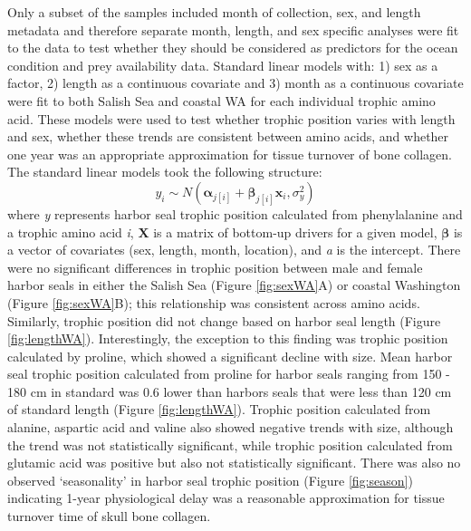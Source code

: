 \documentclass [11pt, proquest] {uwthesis}[2015/03/03]
\begin{document}
Only a subset of the samples included month of collection, sex, and
length metadata and therefore separate month, length, and sex specific
analyses were fit to the data to test whether they should be considered
as predictors for the ocean condition and prey availability data.
Standard linear models with: 1) sex as a factor, 2) length as a
continuous covariate and 3) month as a continuous covariate were fit to
both Salish Sea and coastal WA for each individual trophic amino acid.
These models were used to test whether trophic position varies with
length and sex, whether these trends are consistent between amino acids,
and whether one year was an appropriate approximation for tissue
turnover of bone collagen. The standard linear models took the following
structure:
\begin{equation} 
 y_i \sim N(\boldsymbol{\alpha}_{j[i]} + \boldsymbol{\beta}_{j[i]}\boldsymbol{x}_i, \sigma^2_y)
  \label{eq:hiermods2}
\end{equation}
where \emph{y} represents harbor seal trophic position calculated from
phenylalanine and a trophic amino acid \emph{i}, \(\boldsymbol{X}\) is a
matrix of bottom-up drivers for a given model, \(\boldsymbol{\beta}\) is
a vector of covariates (sex, length, month, location), and \emph{a} is
the intercept. There were no significant differences in trophic position
between male and female harbor seals in either the Salish Sea (Figure
\ref{fig:sexWA}A) or coastal Washington (Figure \ref{fig:sexWA}B); this
relationship was consistent across amino acids. Similarly, trophic
position did not change based on harbor seal length (Figure
\ref{fig:lengthWA}). Interestingly, the exception to this finding was
trophic position calculated by proline, which showed a significant
decline with size. Mean harbor seal trophic position calculated from
proline for harbor seals ranging from 150 - 180 cm in standard was 0.6
lower than harbors seals that were less than 120 cm of standard length
(Figure \ref{fig:lengthWA}). Trophic position calculated from alanine,
aspartic acid and valine also showed negative trends with size, although
the trend was not statistically significant, while trophic position
calculated from glutamic acid was positive but also not statistically
significant. There was also no observed `seasonality' in harbor seal
trophic position (Figure \ref{fig:season}) indicating 1-year
physiological delay was a reasonable approximation for tissue turnover
time of skull bone collagen.
\end{document}
